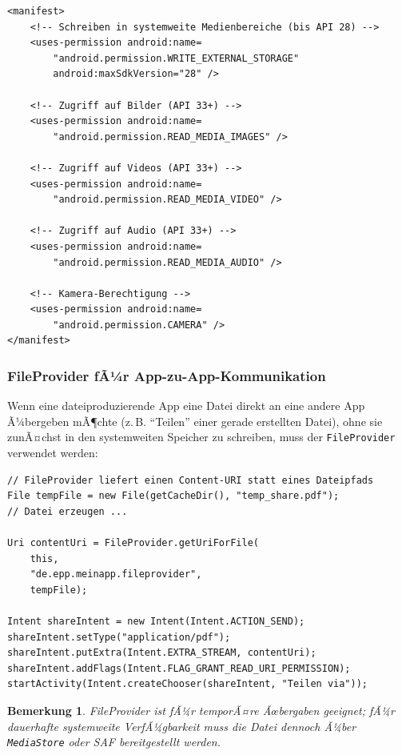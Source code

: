 ﻿\documentclass[12pt, a4paper]{article}
\newtheorem{bemerkung}[definition]{Bemerkung}
\begin{document}
\begin{lstlisting}[style=xml, caption={AndroidManifest.xml: Korrekte Berechtigungen fuer Medienzugriff}]
<manifest>
    <!-- Schreiben in systemweite Medienbereiche (bis API 28) -->
    <uses-permission android:name=
        "android.permission.WRITE_EXTERNAL_STORAGE"
        android:maxSdkVersion="28" />
    
    <!-- Zugriff auf Bilder (API 33+) -->
    <uses-permission android:name=
        "android.permission.READ_MEDIA_IMAGES" />
    
    <!-- Zugriff auf Videos (API 33+) -->
    <uses-permission android:name=
        "android.permission.READ_MEDIA_VIDEO" />
    
    <!-- Zugriff auf Audio (API 33+) -->
    <uses-permission android:name=
        "android.permission.READ_MEDIA_AUDIO" />
    
    <!-- Kamera-Berechtigung -->
    <uses-permission android:name=
        "android.permission.CAMERA" />
</manifest>
\end{lstlisting}

\subsubsection{FileProvider fÃ¼r App-zu-App-Kommunikation}

Wenn eine dateiproduzierende App eine Datei direkt an eine andere App Ã¼bergeben
mÃ¶chte (z.\,B. \enquote{Teilen} einer gerade erstellten Datei), ohne sie zunÃ¤chst
in den systemweiten Speicher zu schreiben, muss der \texttt{FileProvider}
verwendet werden:

\begin{lstlisting}[style=android, caption={FileProvider fuer temporaere Dateiuebergabe}]
// FileProvider liefert einen Content-URI statt eines Dateipfads
File tempFile = new File(getCacheDir(), "temp_share.pdf");
// Datei erzeugen ...

Uri contentUri = FileProvider.getUriForFile(
    this,
    "de.epp.meinapp.fileprovider",
    tempFile);

Intent shareIntent = new Intent(Intent.ACTION_SEND);
shareIntent.setType("application/pdf");
shareIntent.putExtra(Intent.EXTRA_STREAM, contentUri);
shareIntent.addFlags(Intent.FLAG_GRANT_READ_URI_PERMISSION);
startActivity(Intent.createChooser(shareIntent, "Teilen via"));
\end{lstlisting}

\begin{bemerkung}
FileProvider ist fÃ¼r \emph{temporÃ¤re} Ãœbergaben geeignet; fÃ¼r dauerhafte
systemweite VerfÃ¼gbarkeit muss die Datei dennoch Ã¼ber \texttt{MediaStore}
oder SAF bereitgestellt werden.
\end{bemerkung}
\end{document}
